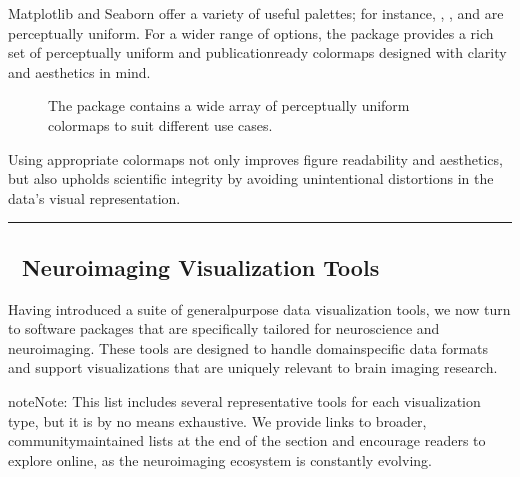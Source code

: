\documentclass[letterpaper,10pt,english]{jupyterBook}
\begin{document}
\sphinxAtStartPar
Matplotlib and Seaborn offer a variety of useful palettes; for instance, , , and  are perceptually uniform. For a wider range of options, the  package provides a rich set of perceptually uniform and publication\sphinxhyphen{}ready colormaps designed with clarity and aesthetics in mind.

\begin{figure}[htbp]
\centering
\capstart

\noindent{}
\caption{The  package contains a wide array of perceptually uniform colormaps to suit different use cases.}\label{\detokenize{chapters/03/03b_visualization-tools:colorcet}}\end{figure}

\sphinxAtStartPar
Using appropriate colormaps not only improves figure readability and aesthetics, but also upholds scientific integrity by avoiding unintentional distortions in the data’s visual representation.


\bigskip\hrule\bigskip



\subsection{🧠 Neuroimaging Visualization Tools}
\label{\detokenize{chapters/03/03b_visualization-tools:neuroimaging-visualization-tools}}
\sphinxAtStartPar
Having introduced a suite of general\sphinxhyphen{}purpose data visualization tools, we now turn to software packages that are specifically tailored for neuroscience and neuroimaging. These tools are designed to handle domain\sphinxhyphen{}specific data formats and support visualizations that are uniquely relevant to brain imaging research.

\begin{sphinxadmonition}{note}{Note:}
\sphinxAtStartPar
This list includes several representative tools for each visualization type, but it is by no means exhaustive. We provide links to broader, community\sphinxhyphen{}maintained lists at the end of the section and encourage readers to explore online, as the neuroimaging ecosystem is constantly evolving.
\end{sphinxadmonition}
\end{document}
